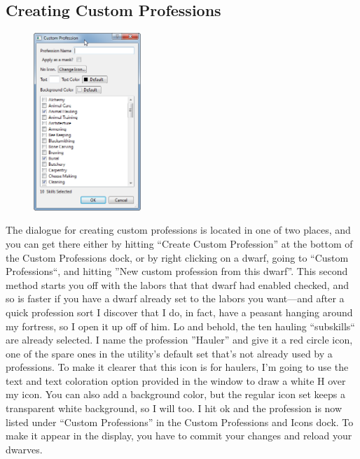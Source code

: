 \documentclass[]{article}
\begin{document}
\subsection{Creating Custom Professions}
\label{sec:Creating Custom Professions}
\begin{figure}
\vspace{-20pt}
  \begin{center}
    \includegraphics[width=0.36\textwidth]{Sec3Fig10}
  \end{center}
\vspace{-15pt}
\end{figure}
The dialogue for creating custom professions is located in one of two places, and you can get there
either by hitting ``Create Custom Profession'' at the bottom of the Custom Professions dock, or by right
clicking on a dwarf, going to ``Custom Professions``, and hitting ''New custom profession from this dwarf''.
This second method starts you off with the labors that that dwarf had enabled checked, and so is faster
if you have a dwarf already set to the labors you want---and after a quick profession sort I discover
that I do, in fact, have a peasant hanging around my fortress, so I open it up off of him. Lo and behold,
the ten hauling ``subskills`` are already selected. I name the profession ''Hauler'' and give it a red circle
icon, one of the spare ones in the utility's default set that's not already used by a professions. To
make it clearer that this icon is for haulers, I'm going to use the text and text coloration option
provided in the window to draw a white H over my icon. You can also add a background color, but the
regular icon set keeps a transparent white background, so I will too. I hit ok and the profession is now
listed under ``Custom Professions'' in the Custom Professions and Icons dock. To make it appear in the
display, you have to commit your changes and reload your dwarves.
\end{document}
